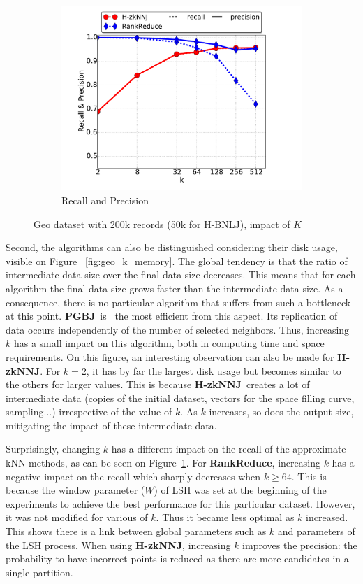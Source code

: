 \documentclass[10pt,journal,compsoc]{IEEEtran}
\newcommand{\Z}{{\bf H-zkNNJ}}
\newcommand{\LSH}{{\bf RankReduce}}
\newcommand{\VO}{{\bf PGBJ}}
\begin{document}
\begin{figure}[htp]
\begin{subfigure}[b]{0.35\textwidth}
		\includegraphics[width=\textwidth]{k_accuracy.pdf} 
		\caption{Recall and Precision \label{fig:geo_k_acc}}            
	\end{subfigure}%
	\caption{ Geo dataset with 200k records (50k for H-BNLJ), impact of $K$  }
	\label{fig:geo_impact_k}
\end{figure}

Second, the algorithms can also be distinguished considering their disk usage, visible on 
Figure ~\ref{fig:geo_k_memory}. The global tendency is that the ratio of intermediate data size over the final data 
size decreases. This means that for each algorithm the final 
data size grows faster than the intermediate data size. As a consequence, there is no particular algorithm that 
suffers from such a bottleneck at this point.
\VO~is \ the most efficient from this aspect. Its replication of data occurs independently of the number of 
selected neighbors. Thus, increasing $k$ has a small impact on this algorithm, both in computing time and space 
requirements. On this figure, an interesting observation can also be made for \Z. For $k=2$, it has by far the 
largest disk
usage but becomes similar to the others for larger values. 
This is because \Z~creates a lot of intermediate data (copies of the initial dataset, vectors for the space 
filling curve, sampling...) irrespective of the value of $k$. As $k$ increases, so does the output size, mitigating the 
impact of these intermediate data. 

Surprisingly, changing $k$ has a different impact on the recall of the approximate kNN methods, as can be seen on 
Figure~\ref{fig:geo_k_acc}.
For \LSH, increasing $k$ has a negative impact on the recall which sharply decreases when $k\geq 64$. This is
because the window parameter ($W$) of LSH was set at the beginning of the experiments to achieve the best performance for this
particular dataset. However, it was not modified for various of $k$. Thus it became less optimal as $k$ increased. This 
shows there is a link between global parameters such 
as $k$ and parameters of the LSH process. When using \Z, 
increasing $k$  improves the precision: the probability to have incorrect points is reduced as there are more 
candidates in a single partition. 
\end{document}
